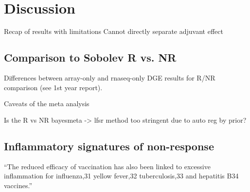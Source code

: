 \section{Discussion}

\begin{outline}
\1 Recap of results with limitations
\1 Cannot directly separate adjuvant effect
\end{outline}

\subsection{Comparison to Sobolev R vs. NR}

\begin{outline}
\1 Differences between array-only and rnaseq-only DGE results for R/NR comparison (see 1st year report).

\1 Caveats of the meta analysis

\1 Is the R vs NR bayesmeta -> lfsr method too stringent due to auto reg by prior?
\end{outline}

\subsection{Inflammatory signatures of non-response}

\enquote{The reduced efficacy of vaccination has also been linked to excessive inflammation for influenza,31 yellow fever,32 tuberculosis,33 and hepatitis B34 vaccines.}

